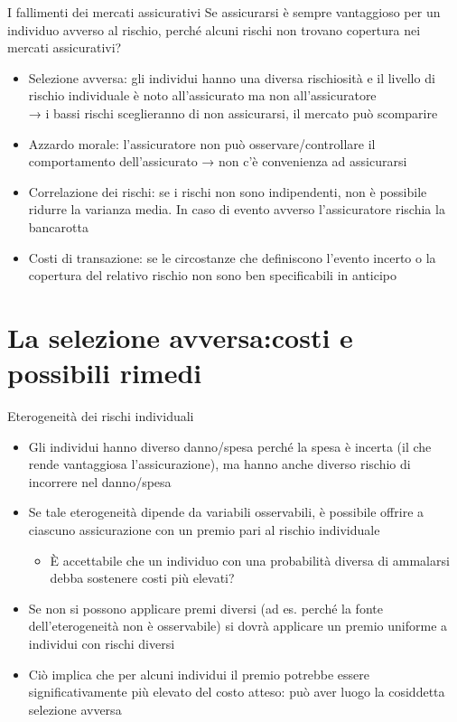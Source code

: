 \documentclass[aspectratio=149,11pt]{beamer}
\begin{document}
\begin{frame}{I fallimenti dei mercati assicurativi}
Se assicurarsi è sempre vantaggioso per un individuo avverso al rischio, perché alcuni rischi non trovano copertura nei mercati assicurativi?

\begin{itemize}
\item \alert{Selezione avversa}: gli individui hanno una diversa rischiosità e il
livello di rischio individuale è noto all'assicurato ma non all'assicuratore\\[0pt]
→ i bassi rischi sceglieranno di non assicurarsi, il mercato può scomparire
\item \alert{Azzardo morale}: l'assicuratore non può osservare/controllare il
comportamento dell'assicurato
→ non c'è convenienza ad assicurarsi
\item \alert{Correlazione dei rischi}: se i rischi non sono indipendenti, non è
possibile ridurre la varianza media. In caso di evento avverso
l'assicuratore rischia la bancarotta
\item \alert{Costi di transazione}: se le circostanze che definiscono l'evento incerto o
la copertura del relativo rischio non sono ben specificabili in anticipo
\end{itemize}
\end{frame}

\section{La selezione avversa:\newline costi e possibili rimedi}

\begin{frame}{Eterogeneità dei rischi individuali}
\begin{itemize}
\item Gli individui hanno diverso danno/spesa perché la spesa è incerta (il che
rende vantaggiosa l'assicurazione), ma hanno anche diverso rischio di
incorrere nel danno/spesa
\item Se tale eterogeneità dipende da variabili osservabili, è possibile offrire a
ciascuno assicurazione con un premio pari al rischio individuale
\begin{itemize}
\item È accettabile che un individuo con una probabilità diversa di ammalarsi
debba sostenere costi più elevati?
\end{itemize}
\item Se non si possono applicare premi diversi (ad es. perché la fonte
dell'eterogeneità non è osservabile) si dovrà applicare un premio uniforme a
individui con rischi diversi
\item Ciò implica che per alcuni individui il premio potrebbe essere
significativamente più elevato del costo atteso: può aver luogo la
cosiddetta \alert{selezione avversa}
\end{itemize}
\end{frame}
\end{document}
